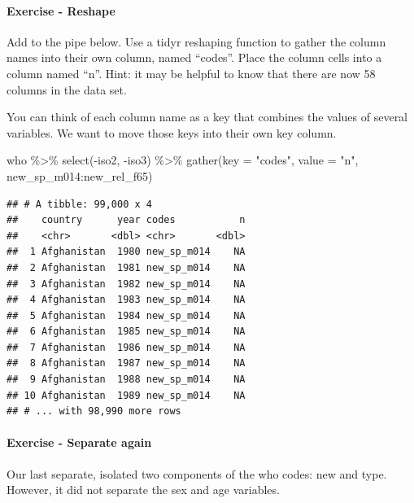 \documentclass[
]{article}
\newenvironment{Shaded}{\begin{snugshade}}{\end{snugshade}}
\newcommand{\AttributeTok}[1]{\textcolor[rgb]{0.77,0.63,0.00}{#1}}
\newcommand{\FunctionTok}[1]{\textcolor[rgb]{0.00,0.00,0.00}{#1}}
\newcommand{\NormalTok}[1]{#1}
\newcommand{\SpecialCharTok}[1]{\textcolor[rgb]{0.00,0.00,0.00}{#1}}
\newcommand{\StringTok}[1]{\textcolor[rgb]{0.31,0.60,0.02}{#1}}
\begin{document}
\hypertarget{exercise---reshape}{%
\paragraph{Exercise - Reshape}\label{exercise---reshape}}

Add to the pipe below. Use a tidyr reshaping function to gather the
column names into their own column, named ``codes''. Place the column
cells into a column named ``n''. Hint: it may be helpful to know that
there are now 58 columns in the data set.

You can think of each column name as a key that combines the values of
several variables. We want to move those keys into their own key column.

\begin{Shaded}
\begin{Highlighting}[]
\NormalTok{who }\SpecialCharTok{\%\textgreater{}\%}
  \FunctionTok{select}\NormalTok{(}\SpecialCharTok{{-}}\NormalTok{iso2, }\SpecialCharTok{{-}}\NormalTok{iso3) }\SpecialCharTok{\%\textgreater{}\%} 
  \FunctionTok{gather}\NormalTok{(}\AttributeTok{key =} \StringTok{"codes"}\NormalTok{, }\AttributeTok{value =} \StringTok{"n"}\NormalTok{, new\_sp\_m014}\SpecialCharTok{:}\NormalTok{new\_rel\_f65) }
\end{Highlighting}
\end{Shaded}

\begin{verbatim}
## # A tibble: 99,000 x 4
##    country      year codes           n
##    <chr>       <dbl> <chr>       <dbl>
##  1 Afghanistan  1980 new_sp_m014    NA
##  2 Afghanistan  1981 new_sp_m014    NA
##  3 Afghanistan  1982 new_sp_m014    NA
##  4 Afghanistan  1983 new_sp_m014    NA
##  5 Afghanistan  1984 new_sp_m014    NA
##  6 Afghanistan  1985 new_sp_m014    NA
##  7 Afghanistan  1986 new_sp_m014    NA
##  8 Afghanistan  1987 new_sp_m014    NA
##  9 Afghanistan  1988 new_sp_m014    NA
## 10 Afghanistan  1989 new_sp_m014    NA
## # ... with 98,990 more rows
\end{verbatim}

\hypertarget{exercise---separate-again}{%
\paragraph{Exercise - Separate again}\label{exercise---separate-again}}

Our last separate, isolated two components of the who codes: new and
type. However, it did not separate the sex and age variables.
\end{document}
